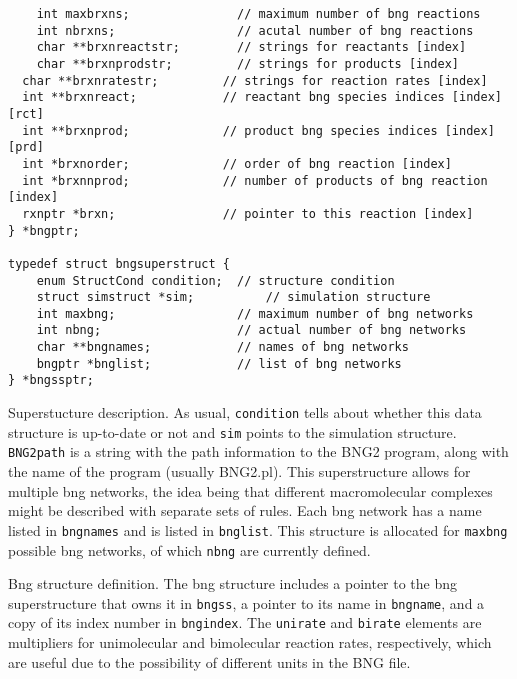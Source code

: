 \documentclass {book}
\begin{document}
\begin{lstlisting}
	int maxbrxns;               // maximum number of bng reactions
	int nbrxns;                 // acutal number of bng reactions
	char **brxnreactstr;        // strings for reactants [index]
	char **brxnprodstr;         // strings for products [index]
  char **brxnratestr;         // strings for reaction rates [index]
  int **brxnreact;            // reactant bng species indices [index][rct]
  int **brxnprod;             // product bng species indices [index][prd]
  int *brxnorder;             // order of bng reaction [index]
  int *brxnnprod;             // number of products of bng reaction [index]
  rxnptr *brxn;               // pointer to this reaction [index]
} *bngptr;

typedef struct bngsuperstruct {
	enum StructCond condition;	// structure condition
	struct simstruct *sim;			// simulation structure
	int maxbng;                 // maximum number of bng networks
	int nbng;                   // actual number of bng networks
	char **bngnames;            // names of bng networks
	bngptr *bnglist;            // list of bng networks
} *bngssptr;
\end{lstlisting}

Superstucture description.  As usual, \texttt{condition} tells about whether this data structure is up-to-date or not and \texttt{sim} points to the simulation structure.  \texttt{BNG2path} is a string with the path information to the BNG2 program, along with the name of the program (usually BNG2.pl).  This superstructure allows for multiple bng networks, the idea being that different macromolecular complexes might be described with separate sets of rules.  Each bng network has a name listed in \texttt{bngnames} and is listed in \texttt{bnglist}.  This structure is allocated for \texttt{maxbng} possible bng networks, of which \texttt{nbng} are currently defined.

Bng structure definition.  The bng structure includes a pointer to the bng superstructure that owns it in \texttt{bngss}, a pointer to its name in \texttt{bngname}, and a copy of its index number in \texttt{bngindex}.  The \texttt{unirate} and \texttt{birate} elements are multipliers for unimolecular and bimolecular reaction rates, respectively, which are useful due to the possibility of different units in the BNG file.
\end{document}

